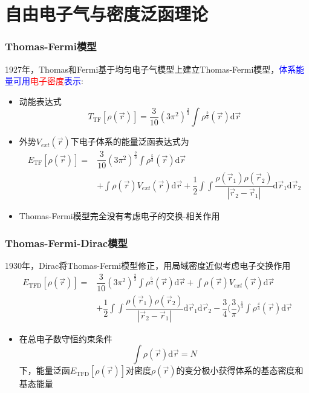 \section{自由电子气与密度泛函理论}       %
\frame
{
	\frametitle{\textrm{Thomas-Fermi}模型} 
	\textrm{1927}年，\textrm{Thomas}和\textrm{Fermi}基于均匀电子气模型上建立\textrm{Thomas-Fermi}模型，\textcolor{blue}{体系能量可用}\textcolor{red}{电子密度}\textcolor{blue}{表示}:
	\begin{itemize}
		\item 动能表达式
			$$T_{\mathrm{TF}}[\rho(\vec r)]=\dfrac3{10}(3\pi^2)^{\frac23}\int\rho^{\frac53}(\vec r)\mathrm{d}\vec r$$
		\item 外势$V_{ext}(\vec r)$下电子体系的能量泛函表达式为
			\begin{displaymath}
				\begin{aligned}
					E_{\mathrm{TF}}[\rho(\vec r)]=&\dfrac3{10}(3\pi^2)^{\frac23}\int\rho^{\frac53}(\vec r)\mathrm{d}\vec r\\
					&+\int\rho(\vec r)V_{ext}(\vec r)\mathrm{d}\vec r+\dfrac12\int\int\dfrac{\rho(\vec r_1)\rho(\vec r_2)}{|\vec r_2-\vec r_1|}\mathrm{d}\vec r_1\mathrm{d}\vec r_2
				\end{aligned}
			\end{displaymath}
		\item \textrm{Thomas-Fermi}模型完全没有考虑电子的交换-相关作用
	\end{itemize}
}

\frame
{
	\frametitle{\textrm{Thomas-Fermi-Dirac}模型} 
	1930年，\textrm{Dirac}将\textrm{Thomas-Fermi}模型修正，用局域密度近似考虑电子交换作用
			\begin{displaymath}
				\begin{aligned}
					E_{\mathrm{TFD}}[\rho(\vec r)]=&\dfrac3{10}(3\pi^2)^{\frac23}\int\rho^{\frac53}(\vec r)\mathrm{d}\vec r+\int\rho(\vec r)V_{ext}(\vec r)\mathrm{d}\vec r\\
					&+\dfrac12\int\int\dfrac{\rho(\vec r_1)\rho(\vec r_2)}{|\vec r_2-\vec r_1|}\mathrm{d}\vec r_1\mathrm{d}\vec r_2-\dfrac34\bigg(\dfrac3{\pi}\bigg)^{\frac13}\int\rho^{\frac43}(\vec r)\mathrm{d}\vec r
				\end{aligned}
			\end{displaymath}
			\begin{itemize}
				\item 在总电子数守恒约束条件
					$$\int\rho(\vec r)\mathrm{d}\vec r=N$$
					下，能量泛函$E_{\mathrm{TFD}}[\rho(\vec r)]$对密度$\rho(\vec r)$的变分极小获得体系的基态密度和基态能量
			\end{itemize}
}

